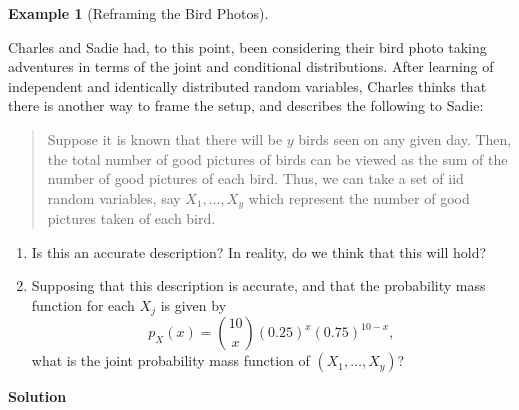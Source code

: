 \documentclass[
  letterpaper,
  DIV=11,
  numbers=noendperiod]{scrreprt}
\providecommand{\tightlist}{%
  \setlength{\itemsep}{0pt}\setlength{\parskip}{0pt}}\usepackage{longtable,booktabs,array}
\theoremstyle{definition}
\theoremstyle{definition}
\newtheorem{example}{Example}[chapter]
\theoremstyle{definition}
\theoremstyle{remark}
\begin{document}
\begin{example}[Reframing the Bird
Photos]\protect\hypertarget{exm-iid}{}\label{exm-iid}

Charles and Sadie had, to this point, been considering their bird photo
taking adventures in terms of the joint and conditional distributions.
After learning of independent and identically distributed random
variables, Charles thinks that there is another way to frame the setup,
and describes the following to Sadie:

\begin{quote}
Suppose it is known that there will be \(y\) birds seen on any given
day. Then, the total number of good pictures of birds can be viewed as
the sum of the number of good pictures of each bird. Thus, we can take a
set of iid random variables, say \(X_1,\dots,X_y\) which represent the
number of good pictures taken of each bird.
\end{quote}

\begin{enumerate}
\def\labelenumi{\alph{enumi}.}
\tightlist
\item
  Is this an accurate description? In reality, do we think that this
  will hold?
\item
  Supposing that this description is accurate, and that the probability
  mass function for each \(X_j\) is given by
  \[p_X(x) = \binom{10}{x}(0.25)^{x}(0.75)^{10-x},\] what is the joint
  probability mass function of \((X_1,\dots,X_y)\)?
\end{enumerate}

\begin{tcolorbox}[enhanced jigsaw, colback=white, colframe=quarto-callout-color-frame, arc=.35mm, leftrule=.75mm, rightrule=.15mm, opacityback=0, breakable, bottomrule=.15mm, left=2mm, toprule=.15mm]

\vspace{-3mm}\textbf{Solution}\vspace{3mm}


\end{tcolorbox}
\end{example}
\end{document}
